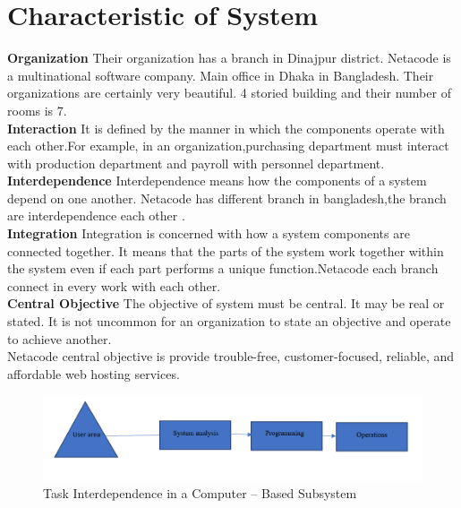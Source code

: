 \documentclass[a4paper,12pt]{report}
\begin{document}
\section {Characteristic of System}
\textbf{Organization}
Their organization has a branch in Dinajpur district. Netacode is a multinational software company. Main office in Dhaka in Bangladesh. Their organizations are certainly very beautiful. 4 storied building and their number of rooms is 7.\\

\textbf{Interaction}
It is defined by the manner in which the components operate with each other.For example, in an organization,purchasing department must interact with production department and payroll with personnel department.\\

\textbf{Interdependence}
Interdependence means how the components of a system depend on one another. Netacode has different branch in bangladesh,the branch  are interdependence each other . \\

\textbf{Integration}
Integration is concerned with how a system components are connected together. It means that the parts of the system work together within the system even if each part performs a unique function.Netacode each branch connect in every work with each other.\\

\textbf{Central Objective}
The objective of system must be central. It may be real or stated. It is not uncommon for an organization to state an objective and operate to achieve another.
\\
Netacode central objective is provide trouble-free, customer-focused, reliable, and affordable web hosting services.
\begin{figure}[h]
	\centering
	\includegraphics[width=0.7\linewidth]{1}
	\caption{Task Interdependence in a Computer – Based Subsystem }
	\label{fig:1}
\end{figure}
\end{document}
